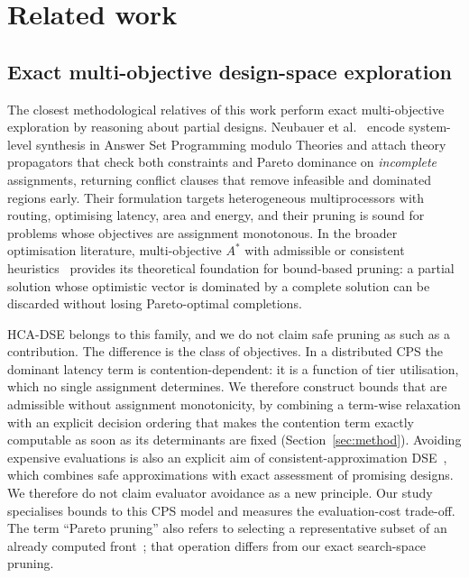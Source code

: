 \section{Related work}
\label{sec:related}

\subsection{Exact multi-objective design-space exploration}
The closest methodological relatives of this work perform exact multi-objective
exploration by reasoning about partial designs. Neubauer et
al.~\cite{neubauer2018exact} encode system-level synthesis in Answer Set Programming
modulo Theories and attach theory propagators that check both constraints and Pareto
dominance on \emph{incomplete} assignments, returning conflict clauses that remove
infeasible and dominated regions early. Their formulation targets heterogeneous
multiprocessors with routing, optimising latency, area and energy, and their pruning is
sound for problems whose objectives are assignment monotonous. In the broader
optimisation literature, multi-objective $A^{*}$ with admissible or
consistent heuristics~\cite{stewart1991moa,mandow2010namoa} provides its theoretical
foundation for bound-based pruning: a partial solution whose optimistic vector is dominated by a complete
solution can be discarded without losing Pareto-optimal completions.

HCA-DSE belongs to this family, and we do not claim safe pruning as such as a
contribution. The difference is the class of objectives. In a distributed CPS the
dominant latency term is contention-dependent: it is a function of tier utilisation,
which no single assignment determines. We therefore construct bounds that are admissible
without assignment monotonicity, by combining a term-wise relaxation with an explicit
decision ordering that makes the contention term exactly computable as soon as its
determinants are fixed (Section~\ref{sec:method}). Avoiding expensive evaluations is also an explicit aim of consistent-approximation
DSE~\cite{neubauer2020consistent}, which combines safe approximations with exact
assessment of promising designs. We therefore do not claim evaluator avoidance
as a new principle. Our study specialises bounds to this CPS model and measures
the evaluation-cost trade-off. The term ``Pareto pruning'' also refers to selecting
a representative subset of an already computed front~\cite{paretopruning2022};
that operation differs from our exact search-space pruning.

